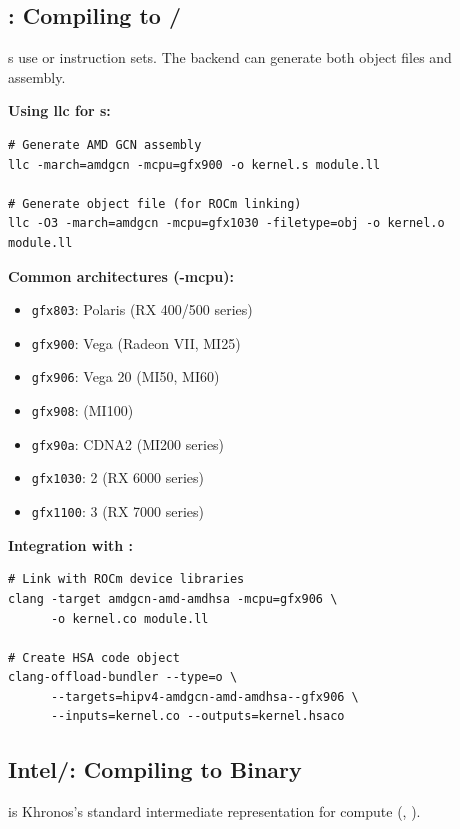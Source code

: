\subsection{: Compiling   to /}

 s use \textbf{} or \textbf{} instruction sets. The   backend can generate both object files and assembly.

\textbf{Using llc for  s:}
\begin{lstlisting}[style=ir]
# Generate AMD GCN assembly
llc -march=amdgcn -mcpu=gfx900 -o kernel.s module.ll

# Generate object file (for ROCm linking)
llc -O3 -march=amdgcn -mcpu=gfx1030 -filetype=obj -o kernel.o module.ll
\end{lstlisting}

\textbf{Common   architectures (-mcpu):}
\begin{itemize}[noitemsep]
  \item \texttt{gfx803}: Polaris (RX 400/500 series)
  \item \texttt{gfx900}: Vega (Radeon VII, MI25)
  \item \texttt{gfx906}: Vega 20 (MI50, MI60)
  \item \texttt{gfx908}:  (MI100)
  \item \texttt{gfx90a}: CDNA2 (MI200 series)
  \item \texttt{gfx1030}: 2 (RX 6000 series)
  \item \texttt{gfx1100}: 3 (RX 7000 series)
\end{itemize}

\textbf{Integration with :}
\begin{lstlisting}[style=ir]
# Link with ROCm device libraries
clang -target amdgcn-amd-amdhsa -mcpu=gfx906 \
      -o kernel.co module.ll

# Create HSA code object
clang-offload-bundler --type=o \
      --targets=hipv4-amdgcn-amd-amdhsa--gfx906 \
      --inputs=kernel.co --outputs=kernel.hsaco
\end{lstlisting}

\subsection{Intel/\acr{OpenCL}: Compiling to  Binary}

\textbf{} is Khronos's standard intermediate representation for  compute (, ).

